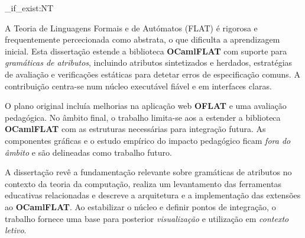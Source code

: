 
\ExplSyntaxOn
\cs_if_exist:NT \TitleOnHeader
  { \TitleOnHeader }
\ExplSyntaxOff

%

A Teoria de Linguagens Formais e de Autómatos (FLAT) é rigorosa e frequentemente percecionada como abstrata, o que dificulta a aprendizagem inicial. 
Esta dissertação estende a biblioteca \textbf{OCamlFLAT} com suporte para \emph{gramáticas de atributos}, incluindo atributos sintetizados e herdados, 
estratégias de avaliação e verificações estáticas para detetar erros de especificação comuns. A contribuição centra-se num núcleo executável fiável e 
em interfaces claras.

O plano original incluía melhorias na aplicação web \textbf{OFLAT} e uma avaliação pedagógica. No âmbito final, o trabalho limita-se aos 
a estender a biblioteca \textbf{OCamlFLAT} com as estruturas necessárias para integração futura. As componentes gráficas e o estudo empírico do 
impacto pedagógico ficam \emph{fora do âmbito} e são delineadas como trabalho futuro.

A dissertação revê a fundamentação relevante sobre gramáticas de atributos no contexto da teoria da computação, realiza um levantamento das 
ferramentas educativas relacionadas e descreve a arquitetura e a implementação das extensões ao \textbf{OCamlFLAT}. Ao estabilizar o núcleo e 
definir pontos de integração, o trabalho fornece uma base para posterior \emph{visualização} e utilização em \emph{contexto letivo}.
